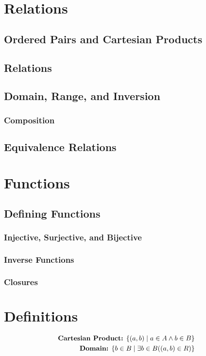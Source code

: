 \documentclass{article}
\begin{document}
\section{Relations}
\subsection{Ordered Pairs and Cartesian Products}
\subsection{Relations}
\subsection{Domain, Range, and Inversion}
\subsubsection{Composition}
\subsection{Equivalence Relations}

\section{Functions}
\subsection{Defining Functions}
\subsubsection{Injective, Surjective, and Bijective}
\subsubsection{Inverse Functions}
\subsubsection{Closures}

\newpage
\appendix

\section{Definitions}

\begin{eqnarray*}
    \text{\textbf{Cartesian Product:} } \{ (a,b) \; | \; a \in A \land b \in B \} \\
    \text{\textbf{Domain:} } \{ b \in B \; | \; \exists b \in B((a,b) \in R) \}
\end{eqnarray*}
\end{document}

